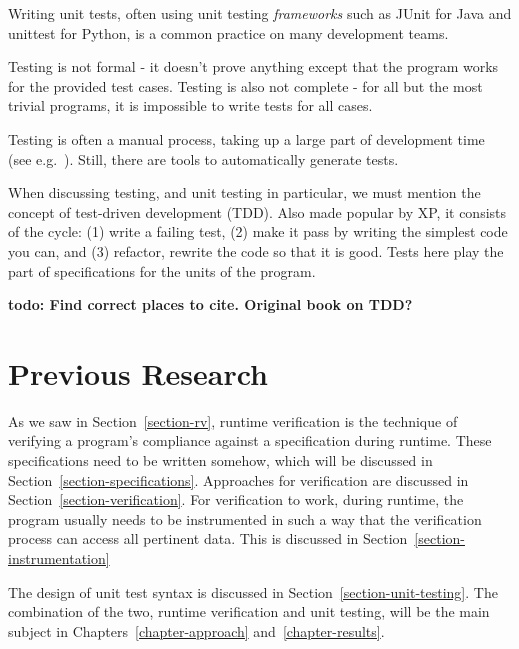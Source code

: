 \documentclass[a4paper,11pt]{kth-mag}
\newcommand{\todo}[1]{\textbf{todo: #1}}
\begin{document}
Writing unit tests, often using unit testing \textit{frameworks} such as JUnit
\cite{junit} for Java and unittest \cite{python-unittest} for Python, is a
common practice on many development teams.

Testing is not formal - it doesn't prove anything except that the program works
for the provided test cases. Testing is also not complete - for all but the
most trivial programs, it is impossible to write tests for all cases.

Testing is often a manual process, taking up a large part of development time
(see e.g.\ \cite{brooks75mythicalmanmonth}). Still, there are tools to automatically
generate tests.

When discussing testing, and unit testing in particular, we must mention the
concept of test-driven development (TDD). Also made popular by XP, it consists
of the cycle: (1) write a failing test, (2) make it pass by writing the
simplest code you can, and (3) refactor, rewrite the code so that it is good.
Tests here play the part of specifications for the units of the program.

\todo{Find correct places to cite. Original book on TDD?}





\pagestyle{newchap}
\chapter{Previous Research} \label{chapter-previous-research}

As we saw in Section~\ref{section-rv}, runtime verification is the technique of
verifying a program's compliance against a specification during runtime. These
specifications need to be written somehow, which will be discussed in
Section~\ref{section-specifications}. Approaches for verification are discussed
in Section~\ref{section-verification}. For verification to work, during
runtime,
the program usually needs to be instrumented in such a way that the
verification process can access all pertinent data. This is discussed in
Section~\ref{section-instrumentation}

The design of unit test syntax is discussed in
Section~\ref{section-unit-testing}. The combination of the two, runtime
verification and unit testing, will be the main subject in
Chapters~\ref{chapter-approach} and~\ref{chapter-results}.
\end{document}
